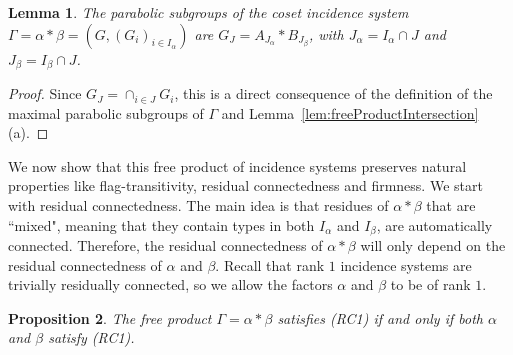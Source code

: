 \documentclass[11pt,letterpaper]{amsart}
\newtheorem{prop}{Proposition}[section]
\newtheorem{lemma}[prop]{Lemma}
\begin{document}
\begin{lemma}
    The parabolic subgroups of the coset incidence system $\Gamma=\alpha*\beta=(G,(G_i)_{i\in I_\alpha})$ are $G_J= A_{J_\alpha}*B_{J_\beta}$, with  $J_\alpha=I_\alpha\cap J$ and $J_\beta = I_\beta\cap J$.
\end{lemma}
\begin{proof}
    Since $G_J=\cap_{i\in J} G_i$, 
    this is a direct consequence of the definition of the maximal parabolic subgroups of $\Gamma$ and Lemma~\ref{lem:freeProductIntersection}(a).
\end{proof}


We now show that this free product of incidence systems preserves natural properties like flag-transitivity, residual connectedness and firmness.
We start with residual connectedness. The main idea is that residues of $\alpha * \beta$ that are ``mixed", meaning that they contain types in both $I_\alpha$ and $I_\beta$, are automatically connected. Therefore, the residual connectedness of $\alpha * \beta$ will only depend on the residual connectedness of $\alpha$ and $\beta$. Recall that rank $1$ incidence systems are trivially residually connected, so we allow the factors $\alpha$ and $\beta$ to be of rank $1$.

\begin{prop}\label{prop:RCfree}
    The free product $\Gamma = \alpha * \beta$ satisfies (RC1) if and only if both $\alpha$ and $\beta$ satisfy (RC1).
\end{prop}
\end{document}
